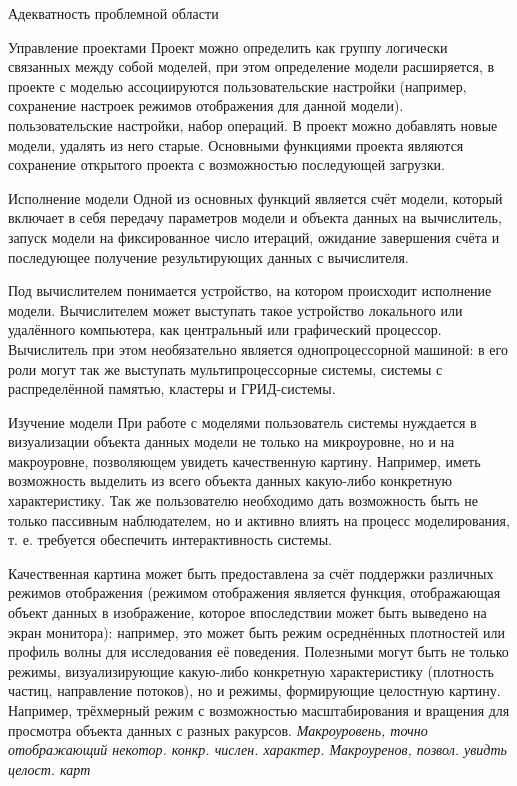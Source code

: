 \documentclass[a4paper,12pt]{extarticle}
\begin{document}
\begin{subsection}{Адекватность проблемной области}
\begin{subsubsection}{Управление проектами}
        Проект можно определить как группу логически связанных между собой моделей, при этом определение модели расширяется, в проекте с моделью ассоциируются пользовательские настройки (например, сохранение настроек режимов отображения для данной модели). пользовательские настройки, набор операций. В проект можно добавлять новые модели, удалять из него старые. Основными функциями проекта являются сохранение открытого проекта с возможностью последующей загрузки.
    \end{subsubsection}
        
    \begin{subsubsection}{Исполнение модели} 
        Одной из основных функций является счёт модели, который включает в себя передачу параметров модели и объекта данных на вычислитель, запуск модели на фиксированное число итераций, ожидание завершения счёта и последующее получение результирующих данных с вычислителя.
        
        Под вычислителем понимается устройство, на котором происходит исполнение модели. Вычислителем может выступать такое устройство локального или удалённого компьютера, как центральный или графический процессор. Вычислитель при этом необязательно является однопроцессорной машиной: в его роли могут так же выступать мультипроцессорные системы, системы с распределённой памятью, кластеры и ГРИД-системы.
    \end{subsubsection}
        
    \begin{subsubsection}{Изучение модели}
        При работе с моделями пользователь системы нуждается в  визуализации объекта данных модели не только на микроуровне, но и на макроуровне, позволяющем увидеть качественную картину. Например, иметь возможность выделить из всего объекта данных какую-либо конкретную характеристику. Так же пользователю необходимо дать возможность быть не только пассивным наблюдателем, но и активно влиять на процесс моделирования, т. е. требуется обеспечить интерактивность системы.
        
        Качественная картина может быть предоставлена за счёт поддержки различных режимов отображения (режимом отображения является функция, отображающая объект данных в изображение, которое впоследствии может быть выведено на экран монитора): например, это может быть режим осреднённых плотностей или профиль волны для исследования её поведения. Полезными могут быть не только режимы, визуализирующие какую-либо конкретную характеристику (плотность частиц, направление потоков), но и режимы, формирующие целостную картину. Например, трёхмерный режим с возможностью масштабирования и вращения для просмотра объекта данных с разных ракурсов.
        \textit{Макроуровень, точно отображающий некотор. конкр. числен. характер.
        Макроуренов, позвол. увидть целост. карт}
    \end{subsubsection}
        

\end{subsection}
\end{document}
